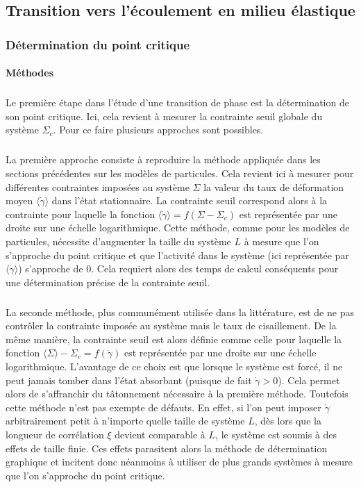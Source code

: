 \subsection{Transition vers l'écoulement en milieu élastique}

\subsubsection{Détermination du point critique}

\label{sec:methodepointcritique}

\paragraph{Méthodes}

\subparagraph{}Le première étape dans l'étude d'une transition de phase est la détermination de son point critique. Ici, cela revient à mesurer la contrainte seuil globale du système $\Sigma_c$. Pour ce faire plusieurs approches sont possibles.

\subparagraph{}La première approche consiste à reproduire la méthode appliquée dans les sections précédentes sur les modèles de particules. Cela revient ici à mesurer pour différentes contraintes imposées au système $\Sigma$ la valeur du taux de déformation moyen $\langle \dot{\gamma}\rangle$ dans l'état stationnaire. La contrainte seuil correspond alors à la contrainte pour laquelle la fonction $\langle \dot{\gamma} \rangle = f(\Sigma-\Sigma_c)$ est représentée par une droite sur une échelle logarithmique. Cette méthode, comme pour les modèles de particules, nécessite d'augmenter la taille du système $L$ à mesure que l'on s'approche du point critique et que l'activité dans le système (ici représentée par $\langle \dot{\gamma}\rangle$) s'approche de $0$. Cela requiert alors des temps de calcul conséquents pour une détermination précise de la contrainte seuil.

\subparagraph{}La seconde méthode, plus communément utilisée dans la littérature, est de ne pas contrôler la contrainte imposée au système mais le taux de cisaillement. De la même manière, la contrainte seuil est alors définie comme celle pour laquelle la fonction $\langle \Sigma \rangle - \Sigma_c = f(\dot{\gamma})$ est représentée par une droite sur une échelle logarithmique. L'avantage de ce choix est que lorsque le système est forcé, il ne peut jamais tomber dans l'état absorbant (puisque de fait $\dot{\gamma}>0$). Cela permet alors de s'affranchir du tâtonnement nécessaire à la première méthode. Toutefois cette méthode n'est pas exempte de défauts. En effet, si l'on peut imposer $\dot{\gamma}$ arbitrairement petit à n'importe quelle taille de système $L$, dès lors que la longueur de corrélation $\xi$ devient comparable à $L$, le système est soumis à des effets de taille finie. Ces effets parasitent alors la méthode de détermination graphique et incitent donc néanmoins à utiliser de plus grands systèmes à mesure que l'on s'approche du point critique.

